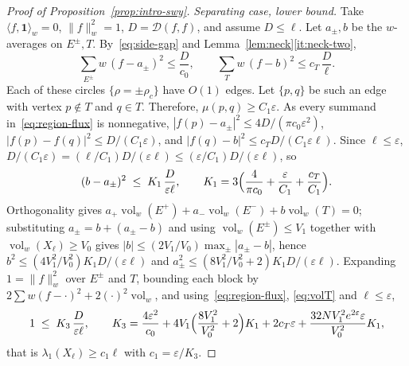 \documentclass[10pt,reqno]{amsart}
\theoremstyle{remark}
\newcommand{\vol}{\operatorname{vol}}
\newcommand{\normw}[1]{\lVert #1 \rVert_{w}}
\newcommand{\DD}{\mathcal{D}}
\begin{document}
\begin{proof}[Proof of Proposition~\ref{prop:intro-swy}]
\emph{Separating case, lower bound.} Take $\langle f,\mathbf1\rangle_w=0$,
$\normw{f}^2=1$, $D=\DD(f,f)$, and assume $D\le\ell$. Let $a_\pm,b$ be
the $w$-averages on $E^\pm,T$. By~\eqref{eq:side-gap} and
Lemma~\ref{lem:neck}\ref{it:neck-two},
\begin{equation}
\label{eq:region-flux}
  \sum_{E^\pm}w\,(f-a_\pm)^2\le\frac{D}{c_0},\qquad
  \sum_{T}w\,(f-b)^2\le c_T\,\frac{D}{\ell}.
\end{equation}
Each of these circles $\{\rho=\pm\rho_c\}$ have $O(1)$ edges. Let $\{p,q\}$ be such an edge with
vertex $p\notin T$ and $q\in T$. Therefore, $\mu(p,q)\ge C_1\varepsilon$. As every
summand in~\eqref{eq:region-flux} is nonnegative,
$|f(p)-a_\pm|^2\le 4D/(\pi c_0\varepsilon^2)$,
$|f(p)-f(q)|^2\le D/(C_1\varepsilon)$, and
$|f(q)-b|^2\le c_TD/(C_1\varepsilon\ell)$.
Since $\ell\le\varepsilon$, $D/(C_1\varepsilon)=(\ell/C_1)D/(\varepsilon\ell)
\le(\varepsilon/C_1)D/(\varepsilon\ell)$, so
\begin{equation}
\label{eq:K1}
  (b-a_\pm)^2\;\le\;K_1\,\frac{D}{\varepsilon\ell},
  \qquad
  K_1=3\Bigl(\frac{4}{\pi c_0}+\frac{\varepsilon}{C_1}+\frac{c_T}{C_1}\Bigr).
\end{equation}
Orthogonality gives
$a_+\vol_w(E^+)+a_-\vol_w(E^-)+b\vol_w(T)=0$; substituting
$a_\pm=b+(a_\pm-b)$ and using $\vol_w(E^\pm)\le V_1$ together with
$\vol_w(X_\ell)\ge V_0$ gives
$|b|\le(2V_1/V_0)\max_\pm|a_\pm-b|$, hence
$b^2\le(4V_1^2/V_0^2)K_1D/(\varepsilon\ell)$ and
$a_\pm^2\le(8V_1^2/V_0^2+2)K_1D/(\varepsilon\ell)$. Expanding
$1=\normw{f}^2$ over $E^\pm$ and $T$, bounding each block by
$2\sum w(f-\cdot)^2+2(\cdot)^2\vol_w$, and
using~\eqref{eq:region-flux}, \eqref{eq:volT} and $\ell\le\varepsilon$,
\begin{equation}
\label{eq:c1}
  1\;\le\;K_3\,\frac{D}{\varepsilon\ell},
  \qquad
  K_3=\frac{4\varepsilon^2}{c_0}
  +4V_1\Bigl(\frac{8V_1^2}{V_0^2}+2\Bigr)K_1
  +2c_T\varepsilon
  +\frac{32NV_1^2e^{2\varepsilon}\varepsilon}{V_0^2}K_1 ,
\end{equation}
that is $\lambda_1(X_\ell)\ge c_1\ell$ with $c_1=\varepsilon/K_3$.


\end{proof}
\end{document}
